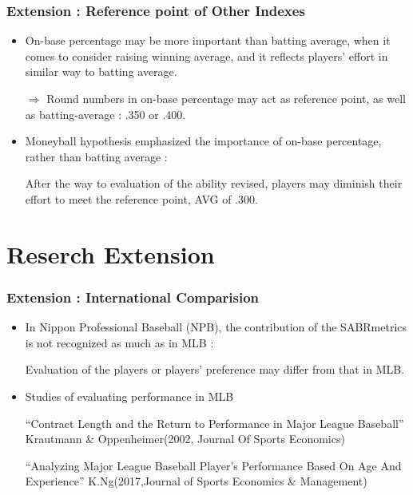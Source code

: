 \documentclass[dvipdfmx,12pt]{beamer}
\begin{document}
\begin{frame}\frametitle{Extension : Reference point of Other Indexes}

 \begin{itemize}
 
 \item On-base percentage may be more important than batting average, when it comes to consider raising winning average, and it reflects players' effort in similar way to batting average.
 
 $\Rightarrow$ Round numbers in on-base percentage may act as reference point, as well as batting-average : .350 or .400.

 \item Moneyball hypothesis emphasized the importance of on-base percentage, rather than batting average : 
 
 After the way to evaluation of the ability revised, players may diminish their effort to meet the reference point, AVG of .300.
 
 \end{itemize}

\end{frame}

\section{Reserch Extension}
\begin{frame}\frametitle{Extension : International Comparision}

 \begin{itemize}
 
 \item In Nippon Professional Baseball (NPB), the contribution of the SABRmetrics is not recognized as much as in MLB :
 
 Evaluation of the players or players' preference may differ from that in MLB.
 
 \item Studies of evaluating performance in MLB
 
 ``Contract Length and the Return to Performance in Major League Baseball'' Krautmann \& Oppenheimer(2002, Journal Of Sports Economics)
 
 ``Analyzing Major League Baseball Player's Performance Based On Age And Experience'' K.Ng(2017,Journal of Sports Economics \& Management)
 
 \end{itemize}

\end{frame}
\end{document}
